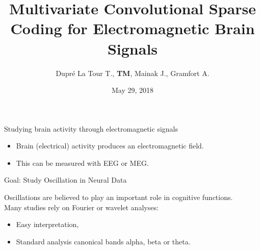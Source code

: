 \documentclass{beamer}
\institute{\\ INRIA Saclay}
\author{Dupré La Tour T., \textbf{TM}, Mainak J., Gramfort A.}
\title{
	Multivariate Convolutional Sparse Coding for Electromagnetic Brain Signals}
\date{
	May 29, 2018
}
\def\keypoint#1{\hspace{0pt plus 1 filll}\textcolor{gray}{#1}}
\def\mycite#1{\keypoint{\small\citep{#1}}}
\begin{document}
	
\begin{frame}
	\titlepage
\end{frame}

\begin{frame}{Studying brain activity through electromagnetic signals}
    \begin{itemize}
        \item Brain (electrical) activity produces an electromagnetic field.
        \item This can be measured with EEG or MEG.
    \end{itemize}
    
\end{frame}

\begin{frame}{Goal: Study Oscillation in Neural Data}

    \textbf{}Oscillations are believed to play an important role in cognitive functions.\\[3em]
    Many studies rely on Fourier or wavelet analyses:\\[.5em]
    \begin{itemize}\itemsep1em
    \item Easy interpretation,
    \item Standard analysis \eg{} canonical bands alpha, beta or theta.\\\mycite{buzsaki2006rhythms}
    \end{itemize}

\end{frame}
\end{document}
